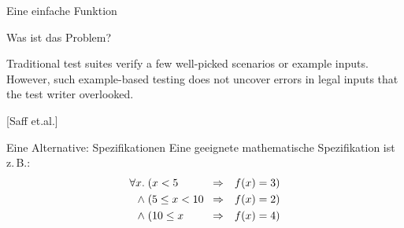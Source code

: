 \begin{frame}[t,fragile]{Eine einfache Funktion}
\begin{minipage}[t]{4.5cm}
\end{minipage}

\end{frame}

\begin{frame}{Was ist das Problem?}

\glqq{}Traditional test suites verify a few well-picked scenarios or example inputs. However, such example-based testing does not uncover errors in legal inputs that the test writer overlooked.\grqq{}

\hfill[Saff et.al.]

\end{frame}

\begin{frame}{Eine Alternative: Spezifikationen}
Eine geeignete mathematische Spezifikation ist z.\,B.:
\begin{eqnarray*}
\forall x. \; \parbox{2cm}{$(x < 5$} &\Rightarrow& f(x) = 3) \\
\land \; \parbox{2cm}{$(5 \leq x < 10$} &\Rightarrow& f(x) = 2)\\
\land \; \parbox{2cm}{$(10 \leq x$} &\Rightarrow& f(x) = 4)
\end{eqnarray*}
\end{frame}





